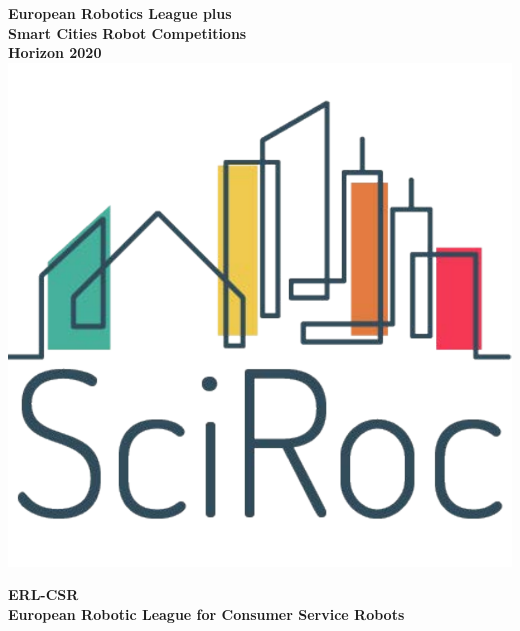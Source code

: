 \vspace*{1mm}
\begin{center}
	\textbf{\large 
 		European Robotics League plus \\ 
 		Smart Cities Robot Competitions \\
 		Horizon 2020\\
 		\includegraphics[scale=0.17]{./fig/logos/SciRoc-logo.pdf}
	}
		
	\vspace*{5mm}
	\hrulefill
	\vspace*{5mm}

	\textbf{%
		{\Huge ERL-CSR}\\[1.5ex]
		{\Large European Robotic League for Consumer Service Robots }\\[1ex]
	}

	\hrulefill
\end{center}

\noindent\textbf{%
}

